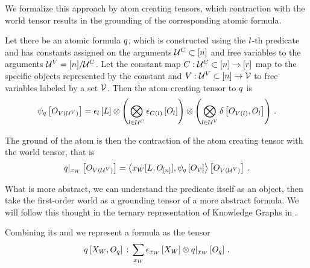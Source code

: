 We formalize this approach by atom creating tensors, which contraction with the world tensor results in the grounding of the corresponding atomic formula.

\begin{definition}\label{def:atomCreatingTensor}
    Let there be an atomic formula $q$, which is constructed using the $l$-th predicate and has constants assigned on the arguments $\mathcal{U}^{C}\subset[n]$ and free variables to the arguments $\mathcal{U}^{V}=[n]/\mathcal{U}^{C}$.
    Let the constant map $C: \mathcal{U}^{C}\subset[n] \rightarrow [r]$ map to the specific objects represented by the constant and $V: \mathcal{U}^{V}\subset[n] \rightarrow \mathcal{V}$ to free variables labeled by a set $\mathcal{V}$.
    Then the atom creating tensor to $q$ is
    \begin{align*}
        \psi_{q}\left[O_{V(\mathcal{U}^{V})}\right]
        = \epsilon_{l}\left[L\right] \otimes
        \left( \bigotimes_{l\in\mathcal{U}^{C}} \epsilon_{C(l)}\left[O_{l}\right] \right) \otimes
        \left( \bigotimes_{l\in\mathcal{U}^{V}} \delta\left[O_{V(l)},O_{l}\right] \right) \, .
    \end{align*}
\end{definition}

The ground of the atom is then the contraction of the atom creating tensor with the world tensor, that is
\begin{align*}
    {q}|_{x_{W}} \left[O_{V(\mathcal{U}^{V})}\right]
    = \left\langle x_{W}[L,O_{[n]}], \psi_{q}\left[O_{\mathcal{V}}\right]\right\rangle \left[ O_{V(\mathcal{U}^{V})} \right] \, .
\end{align*}


What is more abstract, we can understand the predicate itself as an object, then take the first-order world as a grounding tensor of a more abstract formula.
We will follow this thought in the ternary representation of Knowledge Graphs in .



Combining its \substitutionStructure{} and \semanticStructure{} we represent a \firstOrderLogic{} formula as the tensor
\begin{align*}
    q\left[X_{W},O_{q}\right] \,:\,
    \sum_{x_{W}} \epsilon_{x_{W}}\left[X_{W}\right] \otimes {q}|_{x_{W}} \left[O_{q}\right] \, .
\end{align*}



